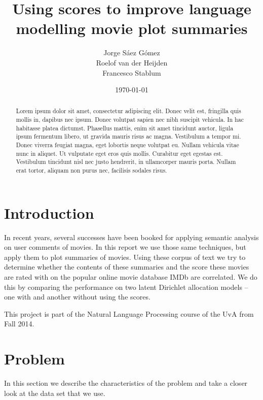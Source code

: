 \documentclass[a4paper,10pt]{article}
\title{Using scores to improve language modelling movie plot summaries}
\author{Jorge S\'{a}ez G\'{o}mez\\
Roelof van der Heijden\\
Francesco Stablum
}
\date{\today}
\begin{document}
\maketitle
\begin{abstract}
  Lorem ipsum dolor sit amet, consectetur adipiscing elit. Donec velit est, fringilla quis mollis in, dapibus nec ipsum. Donec volutpat sapien nec nibh suscipit vehicula. In hac habitasse platea dictumst. Phasellus mattis, enim sit amet tincidunt auctor, ligula ipsum fermentum libero, ut gravida mauris risus ac magna. Vestibulum a tempor mi. Donec viverra feugiat magna, eget lobortis neque volutpat eu. Nullam vehicula vitae nunc in aliquet. Ut vulputate eget eros quis mollis. Curabitur eget egestas est. Vestibulum tincidunt nisl nec justo hendrerit, in ullamcorper mauris porta. Nullam erat tortor, aliquam non purus nec, facilisis sodales risus.
\end{abstract}

\section{Introduction} 
In recent years, several successes have been booked for applying semantic analysis on user comments of movies.
In this report we use those same techniques, but apply them to plot summaries of movies.
Using these corpus of text we try to determine whether the contents of these summaries and the score these movies are rated with on the popular online movie database IMDb \cite{IMDb} are correlated.
We do this by comparing the performance on two latent Dirichlet allocation models -- one with and another without using the scores.

This project is part of the Natural Language Processing course of the UvA from Fall 2014.

\section{Problem}
In this section we describe the characteristics of the problem and take a closer look at the data set that we use.

\end{document}
